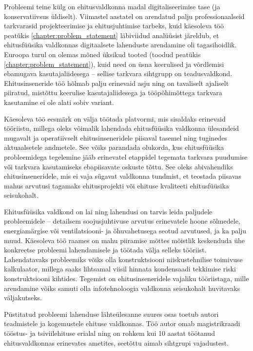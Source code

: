 Probleemi teine külg on ehitusvaldkonna madal digitaliseerimise tase \cite{digitalization_index} (ja konservatiivsus üldiselt). Viimastel aastatel on 
arendatud palju professionaalseid tarkvarasid projekteerimise ja ehitusjuhtimise tarbeks, kuid  käesoleva töö peatükis \ref{chapter:problem_statement} läbiviidud analüüsist
järeldub, et ehitusfüüsika valdkonnas digitaalsete lahenduste arendamine oli tagasihoidlik. Euroopa turul on olemas mõned üksikud tooted (toodud peatükis \ref{chapter:problem_statement}), 
kuid need on üsna keerulised ja võrdlemisi ebamugava kasutajaliidesega -- sellise tarkvara sihtgrupp on teadusvaldkond. Ehitusinseneride töö hõlmab palju erinevaid asju 
ning on tavaliselt ajaliselt piiratud, mistõttu keerulise kasutajaliidesega ja tööpõhimõttega tarkvara kasutamine ei ole alati sobiv variant. 

Käesoleva töö eesmärk on välja töötada platvormi, mis sisaldaks erinevaid tööriistu, millega oleks võimalik lahendada ehitusfüüsika valdkonna ülesandeid mugavalt 
ja operatiivselt ehitusinseneridele piisaval tasemel ning tuginedes aktuaalsetele andmetele. See võiks parandada olukorda, kus ehitusfüüsika probleemidega tegelemine
jääb erinevatel etappidel tegemata tarkvara puudumise või tarkvara kasutamiseks ebapiisavate oskuste tõttu. 
See oleks abivahendiks ehitusinseneridele, mis ei vaja sügavat valdkonna tundmist, et teostada piisavas mahus arvutusi 
tagamaks ehitusprojekti või ehituse kvaliteeti ehitusfüüsika seisukohalt. 

Ehitusfüüsika valdkond on lai ning lahendusi on tarvis leida paljudele probleemidele -- detailsem soojusjuhtivuse arvutus erinevatele hoone sõlmedele,
energiamärgise või ventilatsiooni- ja õhuvahetusega seotud arvutused, ja ka palju muud. Käesoleva töö raames on mahu piiramise mõttes mõistlik
keskenduda ühe konkreetse probleemi lahendamisele ja töötada välja selleks tööriist. Lahendatavaks probleemiks võiks olla konstruktsiooni
niiskustehnilise toimivuse kalkulaator, millega saaks lihtsamal viisil hinnata kondensaadi tekkimise riski konstruktsiooni kihtides.
Tegemist on ehitusinseneridele vajaliku tööriistaga, mille arendamine võiks samuti olla infotehnoloogia valdkonna seisukohalt
huvitavaks väljakutseks.

Püstitatud probleemi lahenduse lähteülesanne suures osas toetub autori teadmistele ja kogemustele ehituse valdkonnas. Töö autor omab magistrikraadi
tööstus- ja tsiviilehituse erialal ning on rohkem kui 10 aastat töötanud ehitusvaldkonnas erinevates ametites, seetõttu aimab sihtgrupi vajadustest. 